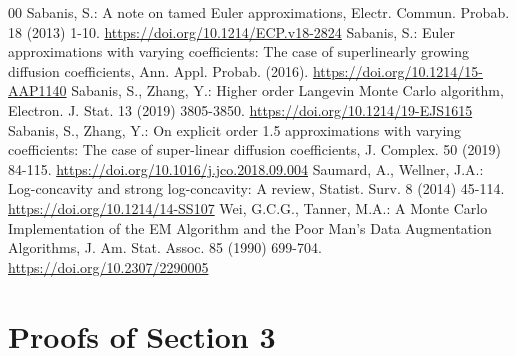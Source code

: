 \documentclass[a4paper, 10pt]{article}
\theoremstyle{plain}%
\begin{document}
\begin{thebibliography}{00}
    Sabanis, S.:
    A note on tamed Euler approximations,
    Electr. Commun. Probab.
    18 (2013) 1-10.
    \url{https://doi.org/10.1214/ECP.v18-2824}
    Sabanis, S.:
    Euler approximations with varying coefficients: The case of superlinearly growing diffusion coefficients,
    Ann. Appl. Probab.
    (2016).
    \url{https://doi.org/10.1214/15-AAP1140}
    Sabanis, S., Zhang, Y.:
    Higher order Langevin Monte Carlo algorithm,
    Electron. J. Stat.
    13 (2019) 3805-3850.
    \url{https://doi.org/10.1214/19-EJS1615}
    Sabanis, S., Zhang, Y.:
    On explicit order 1.5 approximations with varying coefficients: The case of super-linear diffusion coefficients,
    J. Complex.
    50 (2019) 84-115.
    \url{https://doi.org/10.1016/j.jco.2018.09.004}
    Saumard, A., Wellner, J.A.:
    Log-concavity and strong log-concavity: A review,
    Statist. Surv.
    8 (2014) 45-114.
    \url{https://doi.org/10.1214/14-SS107}
    Wei, G.C.G., Tanner, M.A.:
    A Monte Carlo Implementation of the EM Algorithm and the Poor Man’s Data Augmentation Algorithms,
    J. Am. Stat. Assoc.
    85 (1990) 699-704.
    \url{https://doi.org/10.2307/2290005}
\end{thebibliography}
\appendix
\section{Proofs of Section 3}
\end{document}
